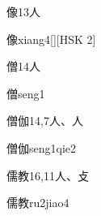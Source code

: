 \begin{entry}{像}{13}{⼈}
  \begin{phonetics}{像}{xiang4}[][HSK 2]
  \end{phonetics}
\end{entry}

\begin{entry}{僧}{14}{⼈}
  \begin{phonetics}{僧}{seng1}
  \end{phonetics}
\end{entry}

\begin{entry}{僧伽}{14,7}{⼈、⼈}
  \begin{phonetics}{僧伽}{seng1qie2}
  \end{phonetics}
\end{entry}

\begin{entry}{儒教}{16,11}{⼈、⽁}
  \begin{phonetics}{儒教}{ru2jiao4}
  \end{phonetics}
\end{entry}


